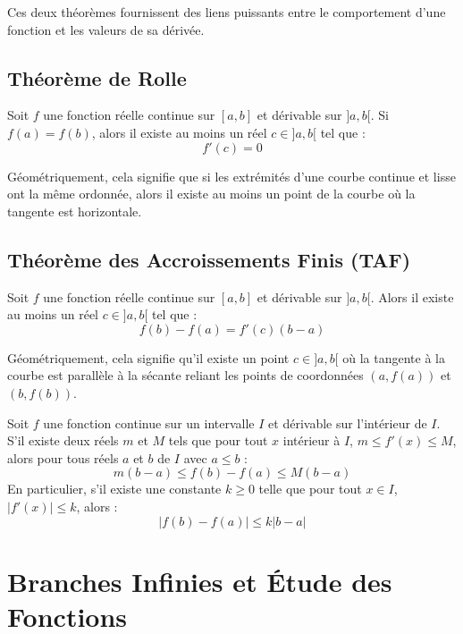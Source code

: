 Ces deux théorèmes fournissent des liens puissants entre le comportement d'une fonction et les valeurs de sa dérivée.

\subsection{Théorème de Rolle}

\begin{theoreme}
Soit $f$ une fonction réelle continue sur $[a, b]$ et dérivable sur $]a, b[$.
Si $f(a) = f(b)$, alors il existe au moins un réel $c \in ]a, b[$ tel que :
\[
f'(c) = 0
\]
\end{theoreme}

Géométriquement, cela signifie que si les extrémités d'une courbe continue et lisse ont la même ordonnée, alors il existe au moins un point de la courbe où la tangente est horizontale.

\subsection{Théorème des Accroissements Finis (TAF)}

\begin{theoreme}
Soit $f$ une fonction réelle continue sur $[a, b]$ et dérivable sur $]a, b[$.
Alors il existe au moins un réel $c \in ]a, b[$ tel que :
\[
f(b) - f(a) = f'(c)(b-a)
\]
\end{theoreme}

Géométriquement, cela signifie qu'il existe un point $c \in ]a,b[$ où la tangente à la courbe est parallèle à la sécante reliant les points de coordonnées $(a, f(a))$ et $(b, f(b))$.

\begin{theoreme}
Soit $f$ une fonction continue sur un intervalle $I$ et dérivable sur l'intérieur de $I$.
S'il existe deux réels $m$ et $M$ tels que pour tout $x$ intérieur à $I$, $m \le f'(x) \le M$, alors pour tous réels $a$ et $b$ de $I$ avec $a \le b$ :
\[
m(b-a) \le f(b) - f(a) \le M(b-a)
\]
En particulier, s'il existe une constante $k \ge 0$ telle que pour tout $x \in I$, $|f'(x)| \le k$, alors :
\[
|f(b) - f(a)| \le k |b-a|
\]
\end{theoreme}

\section{Branches Infinies et Étude des Fonctions}

